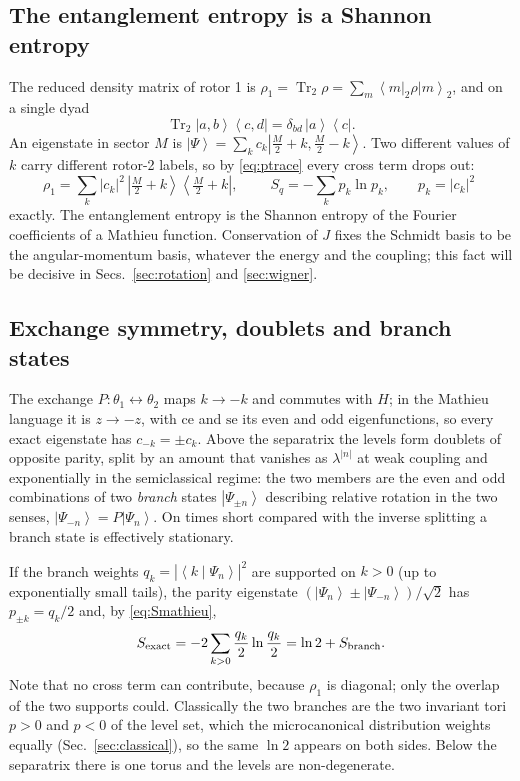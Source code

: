 \documentclass[preprint,12pt]{elsarticle}
\newcommand{\Tr}{\operatorname{Tr}}
\newcommand{\ket}[1]{\left|#1\right\rangle}
\newcommand{\bra}[1]{\left\langle#1\right|}
\newcommand{\braket}[2]{\left\langle#1\middle|#2\right\rangle}
\newcommand{\ketbra}[2]{\left|#1\right\rangle\!\left\langle#2\right|}
\begin{document}
\subsection{The entanglement entropy is a Shannon entropy}
\label{sec:S}

The reduced density matrix of rotor 1 is
$\rho_{1}=\Tr_{2}\rho=\sum_{m}\bra{m}_{2}\rho\ket{m}_{2}$, and on a single dyad
\begin{equation}
\Tr_{2}\ketbra{a,b}{c,d}=\delta_{bd}\,\ketbra ac .
\label{eq:ptrace}
\end{equation}
An eigenstate in sector $M$ is
$\ket\Psi=\sum_{k}c_{k}\ket{\tfrac{M}{2}+k,\tfrac{M}{2}-k}$. Two different
values of $k$ carry different rotor-2 labels, so by \eqref{eq:ptrace} every
cross term drops out:
\begin{equation}
\rho_{1}=\sum_{k}|c_{k}|^{2}\,\ketbra{\tfrac{M}{2}+k}{\tfrac{M}{2}+k},
\qquad
\boxed{\;S_{q}=-\sum_{k}p_{k}\ln p_{k},\qquad p_{k}=|c_{k}|^{2}\;}
\label{eq:Smathieu}
\end{equation}
exactly. The entanglement entropy is the Shannon entropy of the Fourier
coefficients of a Mathieu function. Conservation of $J$ fixes the Schmidt basis
to be the angular-momentum basis, whatever the energy and the coupling; this
fact will be decisive in Secs.~\ref{sec:rotation} and \ref{sec:wigner}.

\subsection{Exchange symmetry, doublets and branch states}
\label{sec:ln2}

The exchange $P:\theta_{1}\leftrightarrow\theta_{2}$ maps $k\to-k$ and commutes
with $H$; in the Mathieu language it is $z\to-z$, with $\mathrm{ce}$ and
$\mathrm{se}$ its even and odd eigenfunctions, so every exact eigenstate has
$c_{-k}=\pm c_{k}$. Above the separatrix the levels form doublets of opposite
parity, split by an amount that vanishes as $\lambda^{|n|}$ at weak coupling
and exponentially in the semiclassical regime: the two members are the even and
odd combinations of two \emph{branch} states $\ket{\Psi_{\pm n}}$ describing
relative rotation in the two senses, $\ket{\Psi_{-n}}=P\ket{\Psi_{n}}$. On
times short compared with the inverse splitting a branch state is effectively
stationary.

If the branch weights $q_{k}=|\braket{k}{\Psi_{n}}|^{2}$ are supported on
$k>0$ (up to exponentially small tails), the parity eigenstate
$(\ket{\Psi_{n}}\pm\ket{\Psi_{-n}})/\sqrt2$ has $p_{\pm k}=q_{k}/2$ and, by
\eqref{eq:Smathieu},
\begin{equation}
S_{\rm exact}=-2\sum_{k>0}\frac{q_{k}}{2}\ln\frac{q_{k}}{2}
=\ln2+S_{\rm branch}.
\label{eq:Sln2}
\end{equation}
Note that no cross term can contribute, because $\rho_{1}$ is diagonal; only
the overlap of the two supports could. Classically the two branches are the
two invariant tori $p>0$ and $p<0$ of the level set, which the microcanonical
distribution weights equally (Sec.~\ref{sec:classical}), so the same $\ln2$
appears on both sides. Below the separatrix there is one torus and the levels
are non-degenerate.
\end{document}
